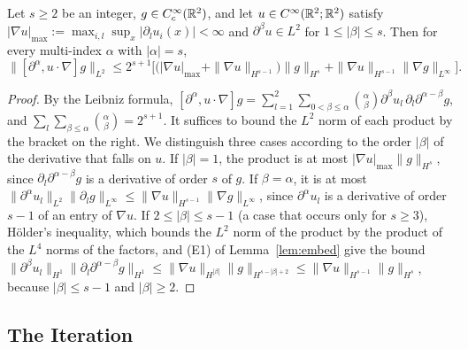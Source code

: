 \begin{lemma}
\label{lem:comm-R2}
Let $s\ge2$ be an integer, $g\in C_c^\infty(\mathbb{R}^2)$, and let
$u\in C^\infty(\mathbb{R}^2;\mathbb{R}^2)$ satisfy
$|\nabla u|_{\max}:=\max_{i,l}\sup_x|\partial_lu_i(x)|<\infty$ and
$\partial^\beta u\in L^2$ for $1\le|\beta|\le s$. Then for every multi-index
$\alpha$ with $|\alpha|=s$,
\[
\|[\partial^\alpha,u\cdot\nabla]g\|_{L^2}\le2^{s+1}\Big[\big(|\nabla u|_{\max}+\|\nabla u\|_{H^{s-1}}\big)\|g\|_{H^s}
+\|\nabla u\|_{H^{s-1}}\|\nabla g\|_{L^\infty}\Big].
\]
\end{lemma}

\begin{proof}
By the Leibniz formula,
$[\partial^\alpha,u\cdot\nabla]g=\sum_{l=1}^2\sum_{0<\beta\le\alpha}\binom\alpha\beta\partial^\beta u_l\,\partial_l\partial^{\alpha-\beta}g$,
and $\sum_l\sum_{\beta\le\alpha}\binom\alpha\beta=2^{s+1}$. It suffices to bound
the $L^2$ norm of each product by the bracket on the right. We distinguish three
cases according to the order $|\beta|$ of the derivative that falls on $u$. If $|\beta|=1$, the product is at
most $|\nabla u|_{\max}\|g\|_{H^s}$, since
$\partial_l\partial^{\alpha-\beta}g$ is a derivative of order $s$ of $g$. If $\beta=\alpha$, it is at most
$\|\partial^\alpha u_l\|_{L^2}\|\partial_lg\|_{L^\infty}\le\|\nabla u\|_{H^{s-1}}\|\nabla g\|_{L^\infty}$,
since $\partial^\alpha u_l$ is a derivative of order $s-1$ of an entry of
$\nabla u$. If $2\le|\beta|\le s-1$ (a case that occurs only for $s\ge3$),
H\"older's inequality, which bounds the $L^2$ norm of the product by the
product of the $L^4$ norms of the factors, and (E1) of
Lemma~\ref{lem:embed} give the bound
$\|\partial^\beta u_l\|_{H^1}\|\partial_l\partial^{\alpha-\beta}g\|_{H^1}
\le\|\nabla u\|_{H^{|\beta|}}\|g\|_{H^{s-|\beta|+2}}\le\|\nabla u\|_{H^{s-1}}\|g\|_{H^s}$,
because $|\beta|\le s-1$ and $|\beta|\ge2$.
\end{proof}

\subsection{The Iteration}

